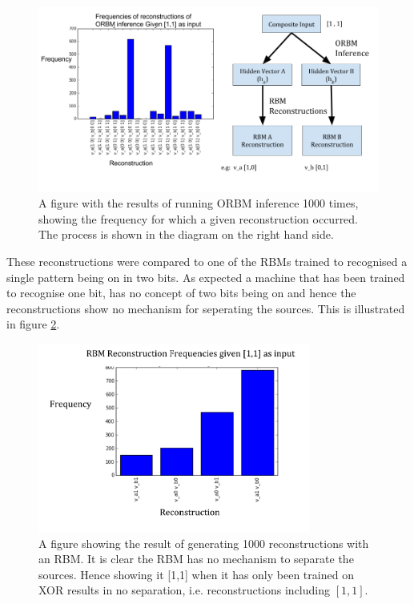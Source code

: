\begin{figure}[h]
  \begin{center}
    \includegraphics[width=6.5in]{Assets/XOR-2-bit-inference-results.png}
  \end{center}
  \caption{A figure with the results of running ORBM inference 1000 times, showing the frequency for which a given reconstruction occurred. The process is shown in the diagram on the right hand side. }

  \label{F:Two-Bit-ORBM-Inference-Results-1}
\end{figure}

These reconstructions were compared to one of the RBMs trained to recognised a single pattern being on in two bits. As expected a machine that has been trained to recognise one bit, has no concept of two bits being on and hence the reconstructions show no mechanism for seperating the sources. This is illustrated in figure \ref{F:Two-Bit-RBM-Inference-Results-1}.


\begin{figure}[h]
  \begin{center}
    \includegraphics[width=0.8\textwidth]{Assets/RBM-two-bit-XOR-Inference.png}
  \end{center}
  \caption{A figure showing the result of generating 1000 reconstructions with an RBM. It is clear the RBM has no mechanism to separate the sources. Hence showing it [1,1] when it has only been trained on XOR results in no separation, i.e. reconstructions including $[1,1]$.}

  \label{F:Two-Bit-RBM-Inference-Results-1}
\end{figure}

